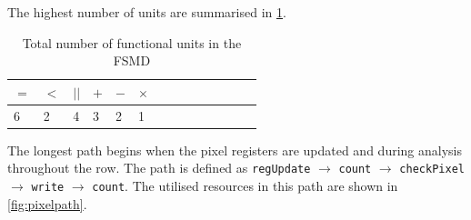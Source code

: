\documentclass[a4paper, english]{article}
\numberwithin{equation}{section}
\begin{document}
The highest number of units are summarised in \cref{tbl:functotal}.
\begin{table}[H]
    \centering
    \caption{Total number of functional units in the FSMD}\label{tbl:functotal}
    \begin{tabular}{llllllllllllll}
        \toprule
        \(=\) & \(<\) & \(||\) & \(+\) & \(-\) & \(\times\) \\
        \midrule
        6     & 2     & 4      & 3     & 2     & 1          \\
        \bottomrule
    \end{tabular}
\end{table}
The longest path begins when the pixel registers are updated and during analysis throughout the row. The path is defined as \texttt{regUpdate} \(\rightarrow\) \texttt{count} \(\rightarrow\) \texttt{checkPixel} \(\rightarrow\) \texttt{write} \(\rightarrow\) \texttt{count}. The utilised resources in this path are shown in \cref{fig:pixelpath}.
\end{document}
